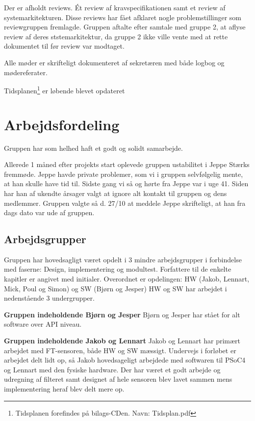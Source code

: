 Der er afholdt reviews. Ét review af kravspecifikationen samt et review af systemarkitekturen. 
Disse reviews har fået afklaret nogle problemstillinger som reviewgruppen fremlagde. 
Gruppen aftalte efter samtale med gruppe 2, at aflyse review af deres ststemarkitektur, da gruppe 2 ikke ville vente med at rette dokumentet til før review var modtaget.  

Alle møder er skrifteligt dokumenteret af sekretæren med både logbog og mødereferater. 

Tidsplanen\footnote{Tidsplanen forefindes på bilags-CDen. Navn: Tidsplan.pdf} er løbende blevet opdateret 

\section{Arbejdsfordeling}

Gruppen har som helhed haft et godt og solidt samarbejde. 

Allerede 1 måned efter projekts start oplevede gruppen ustabilitet i Jeppe Stærks fremmøde. Jeppe havde private problemer, som vi i gruppen selvfølgelig mente, at han skulle have tid til. Sidste gang vi så og hørte fra Jeppe var i uge 41. Siden har han af ukendte årsager valgt at ignore alt kontakt til gruppen og dens medlemmer. Gruppen valgte så d. 27/10 at meddele Jeppe skrifteligt, at han fra dags dato var ude af gruppen.     

\subsection{Arbejdsgrupper}
Gruppen har hovedsagligt været opdelt i 3 mindre arbejdsgrupper i forbindelse med faserne: Design, implementering og modultest. Forfattere til de enkelte kapitler er angivet med initialer.
Overordnet er opdelingen: HW (Jakob, Lennart, Mick, Poul og Simon) og SW (Bjørn og Jesper) 
HW og SW har arbejdet i nedenstående 3 undergrupper.

\textbf{Gruppen indeholdende Bjørn og Jesper} \newline
Bjørn og Jesper har stået for alt software over API niveau.

\textbf{Gruppen indeholdende Jakob og Lennart} \newline
Jakob og Lennart har primært arbejdet med FT-sensoren, både HW og SW mæssigt. Undervejs i forløbet er arbejdet delt lidt op, så Jakob hovedsageligt arbejdede med softwaren til PSoC4 og Lennart med den fysiske hardware. Der har været et godt arbejde og udregning af filteret samt designet af hele sensoren blev lavet sammen mens implementering heraf blev delt mere op. 


